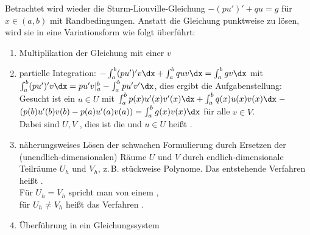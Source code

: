 \begin{Bem}
    Betrachtet wird wieder die Sturm-Liouville-Gleichung
    $-(pu')' + qu = g$ für\\
    $x \in (a, b)$ mit Randbedingungen.
    Anstatt die Gleichung punktweise zu lösen, wird sie in eine
    Variationsform wie folgt überführt:
    \begin{enumerate}
        \item
        Multiplikation der Gleichung mit einer  $v$
        
        \item
        partielle Integration:
        $-\int_a^b (pu')'v\dx + \int_a^b quv\dx = \int_a^b gv\dx$ mit\\
        $\int_a^b (pu')'v\dx = pu'v|_a^b - \int_a^b pu'v'\dx$,
        dies ergibt die Aufgabenstellung:\\
        Gesucht ist ein $u \in U$ mit
        $\int_a^b p(x)u'(x)v'(x)\dx + \int_a^b q(x)u(x)v(x)\dx \;-$\\
        $(p(b)u'(b)v(b) - p(a)u'(a)v(a)) = \int_a^b g(x)v(x)\dx$
        für alle $v \in V$.\\
        Dabei sind $U, V$ ,
        dies ist die  und
        $u \in U$ heißt .
        
        \item
        näherungsweises Lösen der schwachen Formulierung durch Ersetzen
        der (unendlich-dimen\-sionalen) Räume $U$ und $V$ durch
        endlich-dimensionale Teilräume $U_h$ und $V_h$, z.\,B.
        stückweise Polynome.
        Das entstehende Verfahren heißt .\\
        Für $U_h = V_h$ spricht man von einem
        ,\\
        für $U_h \not= V_h$ heißt das Verfahren
        .
        
        \item
        Überführung in ein Gleichungssystem
    \end{enumerate}
\end{Bem}

\linie

